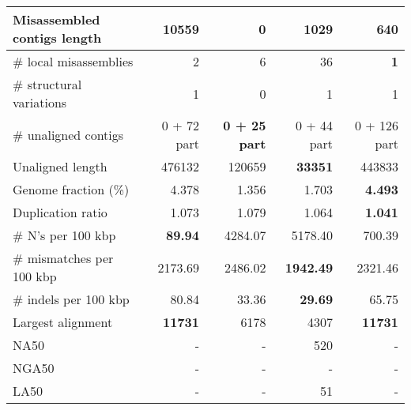\documentclass[12pt,a4paper]{article}
\begin{document}
\begin{table}[ht]
\begin{center}
\begin{tabular}{|l*{4}{|r}|}
Misassembled contigs length & 10559 & {\bf 0} & 1029 & 640 \\ \hline
\# local misassemblies & 2 & 6 & 36 & {\bf 1} \\ \hline
\# structural variations & 1 & 0 & 1 & 1 \\ \hline
\# unaligned contigs & 0 + 72 part & {\bf 0 + 25 part} & 0 + 44 part & 0 + 126 part \\ \hline
Unaligned length & 476132 & 120659 & {\bf 33351} & 443833 \\ \hline
Genome fraction (\%) & 4.378 & 1.356 & 1.703 & {\bf 4.493} \\ \hline
Duplication ratio & 1.073 & 1.079 & 1.064 & {\bf 1.041} \\ \hline
\# N's per 100 kbp & {\bf 89.94} & 4284.07 & 5178.40 & 700.39 \\ \hline
\# mismatches per 100 kbp & 2173.69 & 2486.02 & {\bf 1942.49} & 2321.46 \\ \hline
\# indels per 100 kbp & 80.84 & 33.36 & {\bf 29.69} & 65.75 \\ \hline
Largest alignment & {\bf 11731} & 6178 & 4307 & {\bf 11731} \\ \hline
NA50 & - & - & 520 & - \\ \hline
NGA50 & - & - & - & - \\ \hline
LA50 & - & - & 51 & - \\ \hline
\end{tabular}
\end{center}
\end{table}
\end{document}
